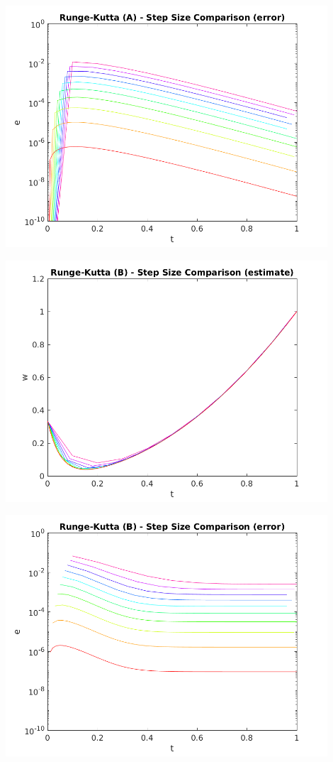 \documentclass{article}
\begin{document}
\begin{center}
  \includegraphics[width=0.9\textwidth]{../output/a_rk_h_err.png}
  \label{fig:a_rk_h_err}
\end{center}

\begin{center}
  \includegraphics[width=0.9\textwidth]{../output/b_rk_h_val.png}
  \label{fig:b_rk_h_val}
\end{center}

\begin{center}
  \includegraphics[width=0.9\textwidth]{../output/b_rk_h_err.png}
  \label{fig:b_rk_h_err}
\end{center}
\end{document}
